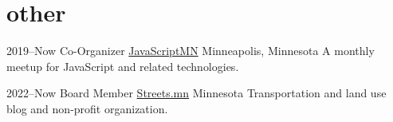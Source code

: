 \documentclass[]{cv-style} %
\begin{document}
\section{other}

\begin{entrylist}


\entry
{2019--Now}
{Co-Organizer {\normalfont \href{https://javascriptmn.com}{JavaScriptMN}}}
{Minneapolis, Minnesota}
{A monthly meetup for JavaScript and related technologies.}



\entry
{2022--Now}
{Board Member {\normalfont \href{https://streets.mn}{Streets.mn}}}
{Minnesota}
{Transportation and land use blog and non-profit organization.}


\end{entrylist}
\end{document}
